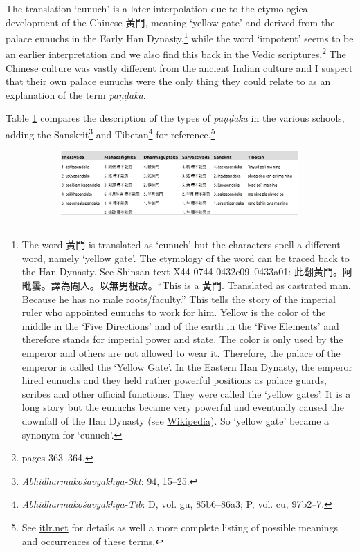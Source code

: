 The translation `eunuch' is a later interpolation due to the etymological development of the Chinese 黃門, meaning `yellow gate' and derived from the palace eunuchs in the Early Han Dynasty,\footnote{The word 黃門 is translated as `eunuch' but the characters spell a different word, namely `yellow gate'. The etymology of the word can be traced back to the Han Dynasty. See Shinsan text X44 0744 0432c09–0433a01: 此翻黃門。阿毗曇。譯為閹人。以無男根故。``This is a 黃門. Translated as castrated man. Because he has no male roots/faculty.'' This tells the story of the imperial ruler who appointed eunuchs to work for him. Yellow is the color of the middle in the `Five Directions' and of the earth in the `Five Elements' and therefore stands for imperial power and state. The color is only used by the emperor and others are not allowed to wear it. Therefore, the palace of the emperor is called the `Yellow Gate'. In the Eastern Han Dynasty, the emperor hired eunuchs and they held rather powerful positions as palace guards, scribes and other official functions. They were called the `yellow gates'. It is a long story but the eunuchs became very powerful and eventually caused the downfall of the Han Dynasty (see \href{https://en.wikipedia.org/wiki/Han_dynasty}{Wikipedia}). So `yellow gate' became a synonym for `eunuch'.} while the word `impotent' seems to be an earlier interpretation and we also find this back in the Vedic scriptures.\footnote{\cite{zwilling} pages 363–364.} The Chinese culture was vastly different from the ancient Indian culture and I suspect that their own palace eunuchs were the only thing they could relate to as an explanation of the term \textit{paṇḍaka}.

Table \ref{pandaka} compares the description of the types of \textit{paṇḍaka} in the various schools, adding the Sanskrit\footnote{\textit{Abhidharmakośavyākhyā-Skt}: 94, 15–25.} and Tibetan\footnote{\textit{Abhidharmakośavyākhyā-Tib}: D, vol. gu, 85b6–86a3; P, vol. cu, 97b2–7.} for reference.\footnote{See \href{http://www.itlr.net/hwid:281142}{itlr.net} for details as well a more complete listing of possible meanings and occurrences of these terms.}

\begin{figure}[!htbp]
  \begin{subfigure}{\textwidth}
    \includegraphics[width=\textwidth]{pandaka.jpg}
  \end{subfigure}
  \label{pandaka}
\end{figure}

